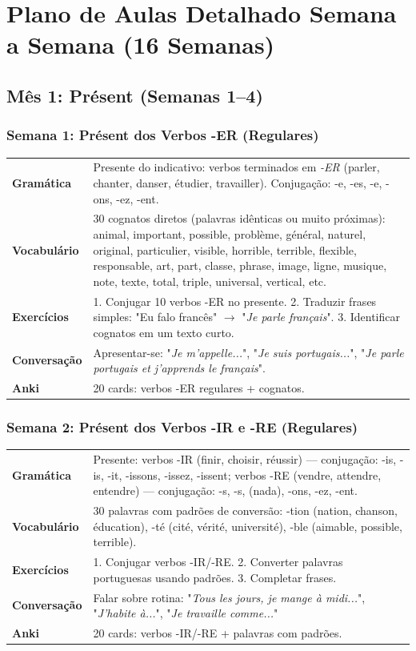 \documentclass[a4paper,12pt]{article}
\begin{document}
\section{Plano de Aulas Detalhado Semana a Semana (16 Semanas)}
\subsection{Mês 1: Présent (Semanas 1–4)}
\subsubsection*{Semana 1: Présent dos Verbos -ER (Regulares)}
\begin{tabularx}{\linewidth}{>{\bfseries}l L}
    Gramática & Presente do indicativo: verbos terminados em \emph{-ER} (parler, chanter, danser, étudier, travailler). Conjugação: -e, -es, -e, -ons, -ez, -ent. \\
    Vocabulário & 30 cognatos diretos (palavras idênticas ou muito próximas): animal, important, possible, problème, général, naturel, original, particulier, visible, horrible, terrible, flexible, responsable, art, part, classe, phrase, image, ligne, musique, note, texte, total, triple, universal, vertical, etc. \\
    Exercícios & 1. Conjugar 10 verbos -ER no presente. 2. Traduzir frases simples: "Eu falo francês" $\to$ "\emph{Je parle français}". 3. Identificar cognatos em um texto curto. \\
    Conversação & Apresentar-se: "\emph{Je m'appelle...}", "\emph{Je suis portugais...}", "\emph{Je parle portugais et j'apprends le français}". \\
    Anki & 20 cards: verbos -ER regulares + cognatos. \\
\end{tabularx}

\subsubsection*{Semana 2: Présent dos Verbos -IR e -RE (Regulares)}
\begin{tabularx}{\linewidth}{>{\bfseries}l L}
    Gramática & Presente: verbos -IR (finir, choisir, réussir) — conjugação: -is, -is, -it, -issons, -issez, -issent; verbos -RE (vendre, attendre, entendre) — conjugação: -s, -s, (nada), -ons, -ez, -ent. \\
    Vocabulário & 30 palavras com padrões de conversão: -tion (nation, chanson, éducation), -té (cité, vérité, université), -ble (aimable, possible, terrible). \\
    Exercícios & 1. Conjugar verbos -IR/-RE. 2. Converter palavras portuguesas usando padrões. 3. Completar frases. \\
    Conversação & Falar sobre rotina: "\emph{Tous les jours, je mange à midi...}", "\emph{J'habite à...}", "\emph{Je travaille comme...}" \\
    Anki & 20 cards: verbos -IR/-RE + palavras com padrões. \\
\end{tabularx}
\end{document}
